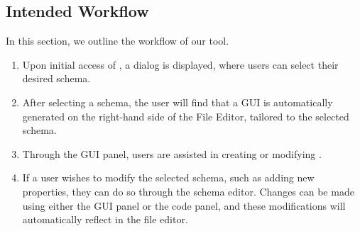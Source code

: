 %

\subsection{Intended Workflow}\label{subsec:workflow} %
In this section, we outline the workflow of our tool.

\begin{enumerate}
    \item Upon initial access of \toolname{}, a dialog is displayed, where users can select their desired schema.
    \item After selecting a schema, the user will find that a GUI is automatically generated on the right-hand side of the File Editor,
    tailored to the selected schema.
    \item Through the GUI panel, users are assisted in creating or modifying \cfgfiles{}.
    \item If a user wishes to modify the selected schema, such as adding new properties, they can do so through the schema editor.
    Changes can be made using either the GUI panel or the code panel, and these modifications will automatically reflect in the file editor.
\end{enumerate}

